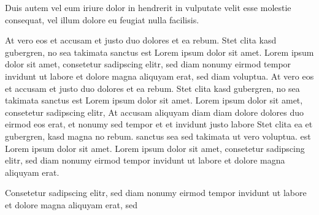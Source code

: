 \documentclass[]{../metanetpaper}
\begin{document}
\begin{Parallel}[c]{80mm}{80mm}
{    Duis autem vel eum iriure dolor in hendrerit in vulputate velit esse molestie consequat, vel illum dolore eu feugiat nulla facilisis.   

    At vero eos et accusam et justo duo dolores et ea rebum. Stet clita kasd gubergren, no sea takimata sanctus est Lorem ipsum dolor sit amet. Lorem ipsum dolor sit amet, consetetur sadipscing elitr, sed diam nonumy eirmod tempor invidunt ut labore et dolore magna aliquyam erat, sed diam voluptua. At vero eos et accusam et justo duo dolores et ea rebum. Stet clita kasd gubergren, no sea takimata sanctus est Lorem ipsum dolor sit amet. Lorem ipsum dolor sit amet, consetetur sadipscing elitr, At accusam aliquyam diam diam dolore dolores duo eirmod eos erat, et nonumy sed tempor et et invidunt justo labore Stet clita ea et gubergren, kasd magna no rebum. sanctus sea sed takimata ut vero voluptua. est Lorem ipsum dolor sit amet. Lorem ipsum dolor sit amet, consetetur sadipscing elitr, sed diam nonumy eirmod tempor invidunt ut labore et dolore magna aliquyam erat.   

    Consetetur sadipscing elitr, sed diam nonumy eirmod tempor invidunt ut labore et dolore magna aliquyam erat, sed
  }

\end{Parallel}
\end{document}
